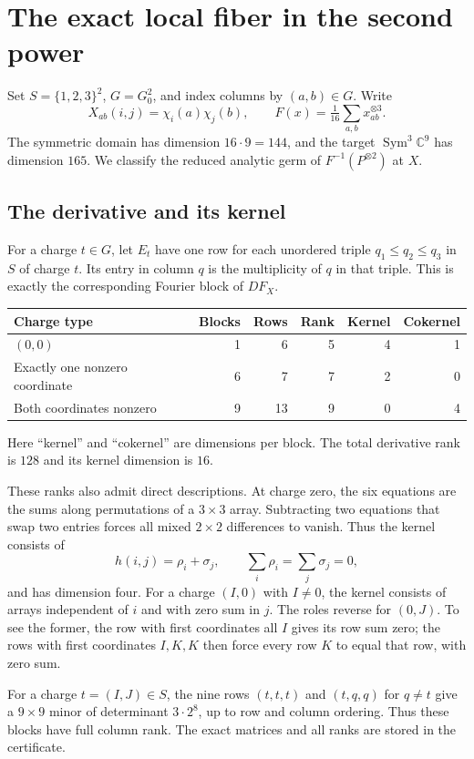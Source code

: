 \documentclass[11pt]{article}
\theoremstyle{definition}\newtheorem{definition}[theorem]{Definition}
\newcommand{\C}{\mathbb C}
\newcommand{\Sym}{\operatorname{Sym}}
\begin{document}
\section{The exact local fiber in the second power}\label{sec:fiber}
Set $S=\{1,2,3\}^2$, $G=G_0^2$, and index columns by $(a,b)\in G$. Write
\[
X_{ab}(i,j)=\chi_i(a)\chi_j(b),\qquad
F(x)=\tfrac1{16}\sum_{a,b}x_{ab}^{\otimes3}.
\]
The symmetric domain has dimension $16\cdot9=144$, and the target $\Sym^3\C^9$ has dimension $165$. We classify the reduced analytic germ of $F^{-1}(P^{\otimes2})$ at $X$.

\subsection{The derivative and its kernel}
For a charge $t\in G$, let $E_t$ have one row for each unordered triple $q_1\le q_2\le q_3$ in $S$ of charge $t$. Its entry in column $q$ is the multiplicity of $q$ in that triple. This is exactly the corresponding Fourier block of $DF_X$.

\begin{center}
\begin{tabular}{lrrrrr}
\toprule
Charge type&Blocks&Rows&Rank&Kernel& Cokernel\\\midrule
$(0,0)$&1&6&5&4&1\\
Exactly one nonzero coordinate&6&7&7&2&0\\
Both coordinates nonzero&9&13&9&0&4\\\bottomrule
\end{tabular}
\end{center}
Here ``kernel'' and ``cokernel'' are dimensions per block. The total derivative rank is $128$ and its kernel dimension is $16$.

These ranks also admit direct descriptions. At charge zero, the six equations are the sums along permutations of a $3\times3$ array. Subtracting two equations that swap two entries forces all mixed $2\times2$ differences to vanish. Thus the kernel consists of
\[
h(i,j)=\rho_i+\sigma_j,\qquad\sum_i\rho_i=\sum_j\sigma_j=0,
\]
and has dimension four. For a charge $(I,0)$ with $I\ne0$, the kernel consists of arrays independent of $i$ and with zero sum in $j$. The roles reverse for $(0,J)$. To see the former, the row with first coordinates all $I$ gives its row sum zero; the rows with first coordinates $I,K,K$ then force every row $K$ to equal that row, with zero sum.

For a charge $t=(I,J)\in S$, the nine rows $(t,t,t)$ and $(t,q,q)$ for $q\ne t$ give a $9\times9$ minor of determinant $3\cdot2^8$, up to row and column ordering. Thus these blocks have full column rank. The exact matrices and all ranks are stored in the certificate.
\end{document}

